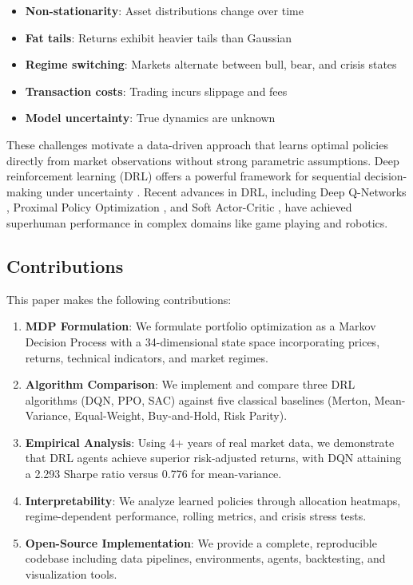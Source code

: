 \documentclass[12pt]{article}
\begin{document}
\begin{itemize}
    \item \textbf{Non-stationarity}: Asset distributions change over time
    \item \textbf{Fat tails}: Returns exhibit heavier tails than Gaussian
    \item \textbf{Regime switching}: Markets alternate between bull, bear, and crisis states
    \item \textbf{Transaction costs}: Trading incurs slippage and fees
    \item \textbf{Model uncertainty}: True dynamics are unknown
\end{itemize}

These challenges motivate a data-driven approach that learns optimal policies directly from market observations without strong parametric assumptions. Deep reinforcement learning (DRL) offers a powerful framework for sequential decision-making under uncertainty \citep{sutton2018}. Recent advances in DRL, including Deep Q-Networks \citep{mnih2015}, Proximal Policy Optimization \citep{schulman2017}, and Soft Actor-Critic \citep{haarnoja2018}, have achieved superhuman performance in complex domains like game playing and robotics.

\subsection{Contributions}

This paper makes the following contributions:

\begin{enumerate}
    \item \textbf{MDP Formulation}: We formulate portfolio optimization as a Markov Decision Process with a 34-dimensional state space incorporating prices, returns, technical indicators, and market regimes.

    \item \textbf{Algorithm Comparison}: We implement and compare three DRL algorithms (DQN, PPO, SAC) against five classical baselines (Merton, Mean-Variance, Equal-Weight, Buy-and-Hold, Risk Parity).

    \item \textbf{Empirical Analysis}: Using 4+ years of real market data, we demonstrate that DRL agents achieve superior risk-adjusted returns, with DQN attaining a 2.293 Sharpe ratio versus 0.776 for mean-variance.

    \item \textbf{Interpretability}: We analyze learned policies through allocation heatmaps, regime-dependent performance, rolling metrics, and crisis stress tests.

    \item \textbf{Open-Source Implementation}: We provide a complete, reproducible codebase including data pipelines, environments, agents, backtesting, and visualization tools.
\end{enumerate}
\end{document}
